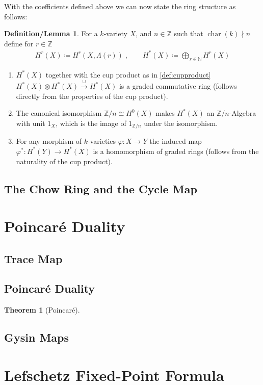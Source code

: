 \documentclass[english]{scrartcl}
\theoremstyle{definition}
\newtheorem{DefLem}[Def]{Definition/Lemma}
\newtheorem{Thm}[Def]{Theorem}
\theoremstyle{remark}
\newcommand*{\N}{\mathds{N}}
\newcommand*{\Z}{\mathds{Z}}
\newcommand*{\Zmod}[1]{\Z/#1} %
\DeclareMathOperator{\Char}{char} %
\renewcommand*{\phi}{\varphi}
\begin{document}
With the coefficients defined above we can now state the ring
structure
as follows:
\begin{DefLem}
  For a $k$-variety $X$, and $n\in\Z$ such that $\Char(k)\nmid n$
  define for $r\in\Z$
  \begin{align*}
    H^r(X) \coloneqq H^r(X,\Lambda(r))\;,\qquad
    H^*(X) \coloneqq \bigoplus_{r\in\N}H^r(X)
  \end{align*}
  \begin{enumerate}
  \item $H^*(X)$ together with the cup product as in \ref{def:cupproduct}
    $H^*(X)\otimes H^*(X)\xrightarrow{\cup} H^*(X)$
    is a graded commutative ring
    (follows directly from the properties of the cup product).
  \item The canonical isomorphism $\Zmod{n}\cong H^0(X)$ makes
    $H^*(X)$ an $\Zmod{n}$-Algebra with unit $1_X$,
    which is the image of $1_{\Zmod{n}}$ under the isomorphism.
  \item For any morphism of $k$-varieties $\phi\colon X\to Y$ the
    induced map $\phi^*\colon H^*(Y)\to H^*(X)$ is a homomorphism of
    graded rings
    (follows from the naturality of the cup product).
  \end{enumerate}
\end{DefLem}

\subsection{The Chow Ring and the Cycle Map}

\section{Poincaré Duality}
\subsection{Trace Map}
\subsection{Poincaré Duality}
\begin{Thm}[Poincaré]
  
\end{Thm}
\subsection{Gysin Maps}

\section{Lefschetz Fixed-Point Formula}
\end{document}
